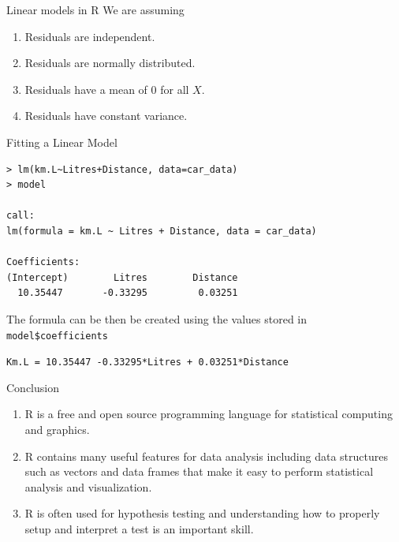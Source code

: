 \documentclass[xcolor=svgnames, 10pt, handout]{beamer}
\begin{document}
\begin{frame}[fragile]{Linear models in R}
We are assuming
\begin{enumerate}
\item Residuals are independent.
\item Residuals are normally distributed.
\item Residuals have a mean of 0 for all $X$.
\item Residuals have constant variance.
\end{enumerate}
\end{frame}


\begin{frame}[fragile]{Fitting a Linear Model}
\begin{Verbatim}[xleftmargin=2em, xrightmargin=1.5em, frame=single, label=Using P-value, framesep=0.5em, commandchars=\\\{\}, fontsize=\small]
> lm(km.L~Litres+Distance, data=car_data)
> model

call:
lm(formula = km.L ~ Litres + Distance, data = car_data)

Coefficients:
(Intercept)        Litres        Distance
  10.35447       -0.33295         0.03251
\end{Verbatim}
The formula can be then be created using the values stored in \verb|model$coefficients|

\verb|Km.L = 10.35447 -0.33295*Litres + 0.03251*Distance|
\end{frame}


\begin{frame}[fragile]{Conclusion}
\begin{enumerate}
\item R is a free and open source programming language for statistical computing and graphics.
\item R contains many useful features for data analysis including data structures such as vectors and data frames that make it easy to perform statistical analysis and visualization.
\item R is often used for hypothesis testing and understanding how to properly setup and interpret a test is an important skill.
\end{enumerate}
\end{frame}
\end{document}
